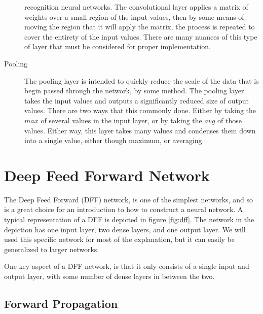 \documentclass[10pt]{amsart}
\newenvironment{Figure}
{\par\medskip\noindent\minipage{\linewidth}}
{\endminipage\par\medskip}
\begin{document}
\begin{multicols}{2}
\begin{description}
      recognition neural networks. The convolutional layer applies a matrix of
      weights over a small region of the input values, then by some means of
      moving the region that it will apply the matrix, the process is repeated
      to cover the entirety of the input values. There are many nuances of
      this type of layer that must be considered for proper implementation.
    \item[Pooling] The pooling layer is intended to quickly reduce the scale of
      the data that is begin passed through the network, by some method. The
      pooling layer takes the input values and outputs a significantly reduced
      size of output values. There are two ways that this commonly done. Either
      by taking the $max$ of several values in the input layer, or by taking
      the $avg$ of those values. Either way, this layer takes many values and
      condenses them down into a single value, either though maximum, or
      averaging.
  \end{description}

  \section{Deep Feed Forward Network}%
  \label{sec:deep_feed_forward_network}

  The Deep Feed Forward (DFF) network, is one of the simplest networks, and so
  is a great choice for an introduction to how to construct a neural network. A
  typical representation of a DFF is depicted in figure \ref{fig:dff}. The
  network in the depiction has one input layer, two dense layers, and one
  output layer. We will used this specific network for most of the explanation,
  but it can easily be generalized to larger networks.

  \begin{Figure}
  \begin{center}
    
  \end{center}
  \label{fig:dff}
  \end{Figure}

  One key aspect of a DFF network, is that it only consists of a single input
  and output layer, with some number of dense layers in between the two.

  \subsection{Forward Propagation}%
  \label{sub:forward_propagation}


\end{multicols}
\end{document}
